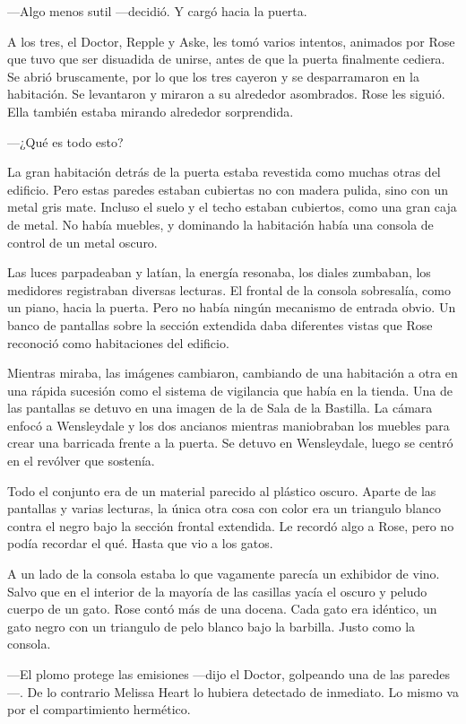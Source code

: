 {---Algo menos sutil ---decidió. Y cargó hacia la puerta.}

{A los tres, el Doctor, Repple y Aske, les tomó varios intentos,
	animados por Rose que tuvo que ser disuadida de unirse, antes de que la
	puerta finalmente cediera. Se abrió bruscamente, por lo que los tres
	cayeron y se desparramaron en la habitación. Se levantaron y miraron a
	su alrededor asombrados. Rose les siguió. Ella también estaba mirando
alrededor sorprendida. }

{---¿Qué es todo esto?}

{La gran habitación detrás de la puerta estaba revestida como muchas
	otras del edificio. Pero estas paredes estaban cubiertas no con madera
	pulida, sino con un metal gris mate. Incluso el suelo y el techo estaban
	cubiertos, como una gran caja de metal. No había muebles, y dominando la
habitación había una consola de control de un metal oscuro.}

{Las luces parpadeaban y latían, la energía resonaba, los diales
	zumbaban, los medidores registraban diversas lecturas. El frontal de la
	consola sobresalía, como un piano, hacia la puerta. Pero no había ningún
	mecanismo de entrada obvio. Un banco de pantallas sobre la sección
	extendida daba diferentes vistas que Rose reconoció como habitaciones
del edificio.}

{Mientras miraba, las imágenes cambiaron, cambiando de una habitación a
	otra en una rápida sucesión como el sistema de vigilancia que había en
	la tienda. Una de las pantallas se detuvo en una imagen de la de Sala de
	la Bastilla. La cámara enfocó a Wensleydale y los dos ancianos mientras
	maniobraban los muebles para crear una barricada frente a la puerta. Se
detuvo en Wensleydale, luego se centró en el revólver que sostenía.}

{Todo el conjunto era de un material parecido al plástico oscuro. Aparte
	de las pantallas y varias lecturas, la única otra cosa con color era un
	triangulo blanco contra el negro bajo la sección frontal extendida. Le
	recordó algo a Rose, pero no podía recordar el qué. Hasta que vio a los
gatos.}

{A un lado de la consola estaba lo que vagamente parecía un exhibidor de
	vino. Salvo que en el interior de la mayoría de las casillas yacía el
	oscuro y peludo cuerpo de un gato. Rose contó más de una docena. Cada
	gato era idéntico, un gato negro con un triangulo de pelo blanco bajo la
barbilla. Justo como la consola.}

{---El plomo protege las emisiones ---dijo el Doctor, golpeando una de
	las paredes---. De lo contrario Melissa Heart lo hubiera detectado de
inmediato. Lo mismo va por el compartimiento hermético.}

